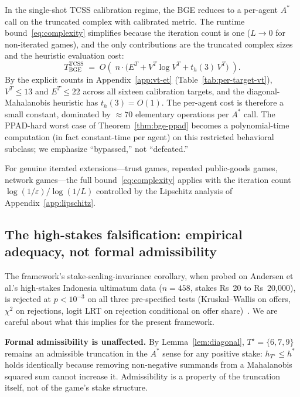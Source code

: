 \documentclass[11pt]{article}
\theoremstyle{definition}
\theoremstyle{remark}
\begin{document}
In the single-shot TCSS calibration regime, the BGE reduces to a per-agent $A^*$ call on the
truncated complex with calibrated metric. The runtime bound~\eqref{eq:complexity} simplifies
because the iteration count is one ($L \to 0$ for non-iterated games), and the only contributions
are the truncated complex sizes and the heuristic evaluation cost:
\[
T_{\mathrm{BGE}}^{\mathrm{TCSS}}
\;=\;
O\!\left(\; n \cdot \bigl(E^T + V^T \log V^T + t_h(3)\,V^T\bigr) \;\right).
\]
By the explicit counts in Appendix~\ref{app:vt-et} (Table~\ref{tab:per-target-vt}), $V^T \leq 13$
and $E^T \leq 22$ across all sixteen calibration targets, and the diagonal-Mahalanobis heuristic
has $t_h(3) = O(1)$. The per-agent cost is therefore a small constant, dominated by $\approx 70$
elementary operations per $A^*$ call. The PPAD-hard worst case of Theorem~\ref{thm:bge-ppad}
becomes a polynomial-time computation (in fact constant-time per agent) on this restricted
behavioral subclass; we emphasize ``bypassed,'' not ``defeated.''

For genuine iterated extensions---trust games, repeated public-goods games, network games---the
full bound~\eqref{eq:complexity} applies with the iteration count $\log(1/\varepsilon)/\log(1/L)$
controlled by the Lipschitz analysis of Appendix~\ref{app:lipschitz}.

\subsection{The high-stakes falsification: empirical adequacy, not formal admissibility}

The framework's stake-scaling-invariance corollary, when probed on Andersen et al.'s
\cite{andersen2011} high-stakes Indonesia ultimatum data ($n{=}458$, stakes Rs~20 to Rs~20{,}000),
is rejected at $p < 10^{-3}$ on all three pre-specified tests (Kruskal--Wallis on offers, $\chi^2$
on rejections, logit LRT on rejection conditional on offer share)~\cite{bond2026tcss}. We are
careful about what this implies for the present framework.

\textbf{Formal admissibility is unaffected.} By Lemma~\ref{lem:diagonal}, $T^\star = \{6, 7, 9\}$
remains an admissible truncation in the $A^*$ sense for any positive stake: $h_{T^\star} \leq h^*$
holds identically because removing non-negative summands from a Mahalanobis squared sum cannot
increase it. Admissibility is a property of the truncation itself, not of the game's stake structure.
\end{document}
